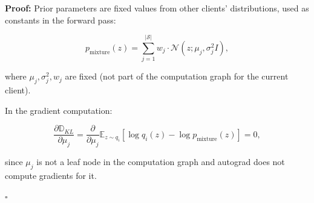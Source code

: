 \textbf{Proof:} Prior parameters are fixed values from other clients' distributions, used as constants in the forward pass:

\begin{equation}
p_{\text{mixture}}(z) = \sum_{j=1}^{|\mathcal{S}|} w_j \cdot \mathcal{N}(z; \mu_j, \sigma_j^2 I),
\end{equation}

where $\mu_j, \sigma_j^2, w_j$ are fixed (not part of the computation graph for the current client).

In the gradient computation:

\begin{equation}
\frac{\partial \mathbb{D}_{KL}}{\partial \mu_j} = \frac{\partial}{\partial \mu_j} \mathbb{E}_{z \sim q_i} \left[ \log q_i(z) - \log p_{\text{mixture}}(z) \right] = 0,
\end{equation}

since $\mu_j$ is not a leaf node in the computation graph and autograd does not compute gradients for it.

$\square$
